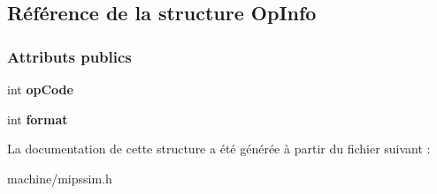 \hypertarget{struct_op_info}{}\subsection{Référence de la structure Op\+Info}
\label{struct_op_info}
\subsubsection*{Attributs publics}
\begin{DoxyCompactItemize}
\item 
\hypertarget{struct_op_info_ae9879a2920b1ee78b2c25985eed94db9}{}\label{struct_op_info_ae9879a2920b1ee78b2c25985eed94db9} 
int {\bfseries op\+Code}
\item 
\hypertarget{struct_op_info_a9b1a1704e5b5d3ccbf063c8481f31fbe}{}\label{struct_op_info_a9b1a1704e5b5d3ccbf063c8481f31fbe} 
int {\bfseries format}
\end{DoxyCompactItemize}


La documentation de cette structure a été générée à partir du fichier suivant \+:\begin{DoxyCompactItemize}
\item 
machine/mipssim.\+h\end{DoxyCompactItemize}
